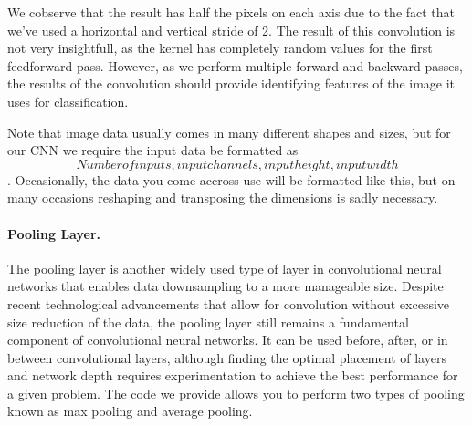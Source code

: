 \documentclass[%
oneside,                 %
final,                   %
10pt]{article}
\begin{document}
We cobserve that the result has half the pixels on each axis due to
the fact that we've used a horizontal and vertical stride of 2. The
result of this convolution is not very insightfull, as the kernel has
completely random values for the first feedforward pass. However, as
we perform multiple forward and backward passes, the results of the
convolution should provide identifying features of the image it uses
for classification.

Note that image data usually comes in many different shapes and sizes,
but for our CNN we require the input data be formatted as \[Number of
inputs, input channels, input height, input width\]. Occasionally, the
data you come accross use will be formatted like this, but on many
occasions reshaping and transposing the dimensions is sadly necessary.

\paragraph{Pooling Layer.}
The pooling layer is another widely used type of layer in
convolutional neural networks that enables data downsampling to a more
manageable size. Despite recent technological advancements that allow
for convolution without excessive size reduction of the data, the
pooling layer still remains a fundamental component of convolutional
neural networks. It can be used before, after, or in between
convolutional layers, although finding the optimal placement of layers
and network depth requires experimentation to achieve the best
performance for a given problem. The code we provide allows you to
perform two types of pooling known as max pooling and average pooling.
\end{document}

